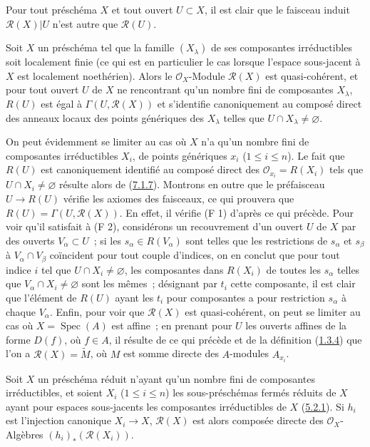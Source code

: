 Pour tout préschéma $X$ et tout ouvert $U\subset X$, il est clair que le
faisceau induit $\mathscr{R}(X)|U$ n'est autre que $\mathscr{R}(U)$.

\begin{proposition}[7.3.3]
\label{I.7.3.3-fr}
Soit $X$ un préschéma tel que la famille $(X_\lambda)$ de ses composantes
irréductibles soit localement finie (ce qui est en particulier le cas lorsque
l'espace sous-jacent à $X$ est localement noethérien). Alors le
$\mathscr{O}_X$-Module $\mathscr{R}(X)$ est quasi-cohérent, et pour tout
ouvert $U$ de $X$ ne rencontrant qu'un nombre fini de composantes $X_\lambda$,
$R(U)$ est égal à $\Gamma(U,\mathscr{R}(X))$ et s'identifie canoniquement au
composé direct des anneaux locaux des points génériques des $X_\lambda$ telles
que $U\cap X_\lambda\neq\varnothing$.
\end{proposition}

On peut évidemment se limiter au cas où $X$ n'a qu'un nombre fini de
composantes irréductibles $X_i$, de points génériques $x_i$
($1\leq i\leq n$). Le fait que $R(U)$ est canoniquement identifié au composé
direct des $\mathscr{O}_{x_i}=R(X_i)$ tels que
$U\cap X_i\neq\varnothing$ résulte alors de
(\hyperref[I.7.1.7-fr]{7.1.7}). Montrons en outre que le préfaisceau
$U\to R(U)$ vérifie les axiomes des faisceaux, ce qui prouvera que
$R(U)=\Gamma(U,\mathscr{R}(X))$. En effet, il vérifie (F 1) d'après ce qui
précède. Pour voir qu'il satisfait à (F 2), considérons un recouvrement d'un
ouvert $U$ de $X$ par des ouverts $V_\alpha\subset U$~; si les
$s_\alpha\in R(V_\alpha)$ sont telles que les restrictions de $s_\alpha$ et
$s_\beta$ à $V_\alpha\cap V_\beta$ coïncident pour tout couple d'indices, on
en conclut que pour tout indice $i$ tel que $U\cap X_i\neq\varnothing$, les
composantes dans $R(X_i)$ de toutes les $s_\alpha$ telles que
$V_\alpha\cap X_i\neq\varnothing$ sont les mêmes~; désignant par $t_i$ cette
composante, il est clair que l'élément de $R(U)$ ayant les $t_i$ pour
composantes a pour restriction $s_\alpha$ à chaque $V_\alpha$. Enfin, pour
voir que $\mathscr{R}(X)$ est quasi-cohérent, on peut se limiter au cas où
$X=\operatorname{Spec}(A)$ est affine~; en prenant pour $U$ les ouverts
affines de la forme $D(f)$, où $f\in A$, il résulte de ce qui précède et de la
définition (\hyperref[I.1.3.4-fr]{1.3.4}) que l'on a
$\mathscr{R}(X)=\widetilde M$, où $M$ est somme directe des $A$-modules
$A_{x_i}$.

\begin{corollary}[7.3.4]
\label{I.7.3.4-fr}
Soit $X$ un préschéma réduit n'ayant qu'un nombre fini de composantes
irréductibles, et soient $X_i$ ($1\leq i\leq n$) les sous-préschémas fermés
réduits de $X$ ayant pour espaces sous-jacents les composantes irréductibles de
$X$ (\hyperref[I.5.2.1-fr]{5.2.1}). Si $h_i$ est l'injection canonique
$X_i\to X$, $\mathscr{R}(X)$ est alors composée directe des
$\mathscr{O}_X$-Algèbres $(h_i)_*(\mathscr{R}(X_i))$.
\end{corollary}

